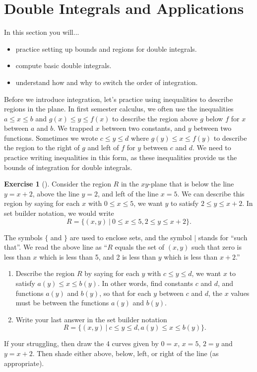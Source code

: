 \documentclass[10pt,]{book}
\theoremstyle{plain}
\theoremstyle{definition}
\theoremstyle{definition}
\theoremstyle{definition}
\theoremstyle{definition}
\newtheorem{exploration}[project]{Exercise}
\theoremstyle{definition}
\numberwithin{equation}{section}
\begin{document}
\section[{Double Integrals and Applications}]{Double Integrals and Applications}\label{section-38}
In this section you will... \leavevmode%
\begin{itemize}[label=\textbullet]
\item{}practice setting up bounds and regions for double integrals.%
\item{}compute basic double integrals.%
\item{}understand how and why to switch the order of integration.%
\end{itemize}
%
\par
Before we introduce integration, let's practice using inequalities to describe regions in the plane. In first semester calculus, we often use the inequalities \(a\leq x\leq b\) and \(g(x)\leq y\leq f(x)\) to describe the region above \(g\) below \(f\) for \(x\) between \(a\) and \(b\). We trapped \(x\) between two constants, and \(y\) between two functions. Sometimes we wrote \(c\leq y\leq d\) where \(g(y)\leq x\leq f(y)\) to describe the region to the right of \(g\) and left of \(f\) for \(y\) between \(c\) and \(d\). We need to practice writing inequalities in this form, as these inequalities provide us the bounds of integration for double integrals.%
\begin{exploration}[]\label{exploration-244}
Consider the region \(R\) in the \(xy\)-plane that is below the line \(y=x+2\), above the line \(y=2\), and left of the line \(x=5\). We can describe this region by saying for each \(x\) with \(0\leq x\leq 5\), we want \(y\) to satisfy \(2\leq y\leq x+2\). In set builder notation, we would write%
\begin{equation*}
R=\{(x,y)\ | \ 0\leq x\leq 5, 2\leq y\leq x+2\}.
\end{equation*}
%
\par
The symbols \(\{\) and \(\}\) are used to enclose sets, and the symbol \(|\) stands for ``such that''. We read the above line as ``\(R\) equals the set of \((x,y)\) such that zero is less than \(x\) which is less than 5, and 2 is less than \(y\) which is less than \(x+2\).''%
\begin{enumerate}[font=\bfseries,label=(\alph*),ref=\alph*]
\item\label{task-669} Describe the region \(R\) by saying for each \(y\) with \(c\leq y\leq d\), we want \(x\) to satisfy \(a(y)\leq x\leq b(y)\). In other words, find constants \(c\) and \(d\), and functions \(a(y)\) and \(b(y)\), so that for each \(y\) between \(c\) and \(d\), the \(x\) values must be between the functions \(a(y)\) and \(b(y)\).%
\item\label{task-670} Write your last answer in the set builder notation%
\begin{equation*}
R=\{(x,y)\ | \ c\leq y\leq d, a(y)\leq x\leq b(y)\}.
\end{equation*}
%
\end{enumerate}
\bigbreak
If your struggling, then draw the 4 curves given by \(0=x\), \(x= 5\), \(2=y\) and \(y= x+2\). Then shade either above, below, left, or right of the line (as appropriate).%
\end{exploration}
\end{document}
